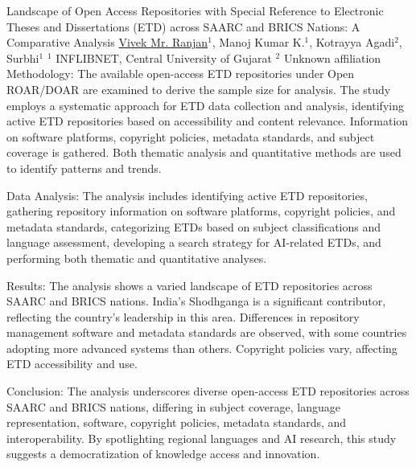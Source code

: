 \begin{abstract_online}{Landscape of Open Access Repositories with Special Reference to Electronic Theses and Dissertations (ETD) across SAARC and BRICS Nations: A Comparative Analysis}{%
    \underline{Vivek Mr. Ranjan}$^{1}$, Manoj Kumar K.$^{1}$, Kotrayya Agadi$^{2}$, Surbhi$^{1}$}{%
    $^1$ INFLIBNET, Central University of Gujarat\newline%
    $^2$ Unknown affiliation%
}
Methodology: The available open-access ETD repositories under Open ROAR/DOAR are examined to derive the sample size for analysis. The study employs a systematic approach for ETD data collection and analysis, identifying active ETD repositories based on accessibility and content relevance. Information on software platforms, copyright policies, metadata standards, and subject coverage is gathered. Both thematic analysis and quantitative methods are used to identify patterns and trends.

Data Analysis: The analysis includes identifying active ETD repositories, gathering repository information on software platforms, copyright policies, and metadata standards, categorizing ETDs based on subject classifications and language assessment, developing a search strategy for AI-related ETDs, and performing both thematic and quantitative analyses.

Results: The analysis shows a varied landscape of ETD repositories across SAARC and BRICS nations. India's Shodhganga is a significant contributor, reflecting the country's leadership in this area. Differences in repository management software and metadata standards are observed, with some countries adopting more advanced systems than others. Copyright policies vary, affecting ETD accessibility and use.

Conclusion: The analysis underscores diverse open-access ETD repositories across SAARC and BRICS nations, differing in subject coverage, language representation, software, copyright policies, metadata standards, and interoperability. By spotlighting regional languages and AI research, this study suggests a democratization of knowledge access and innovation.

\end{abstract_online}


